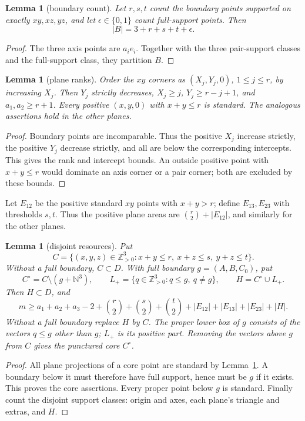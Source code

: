 \documentclass[11pt]{article}
\newtheorem{lemma}[theorem]{Lemma}
\theoremstyle{definition}
\theoremstyle{remark}
\theoremstyle{plain}
\begin{document}
\begin{lemma}[boundary count]\label{res:A.2}
Let $r,s,t$ count the boundary points supported on exactly $xy,xz,yz$,
and let $\epsilon\in\{0,1\}$ count full-support points. Then
\[
 |B|=3+r+s+t+\epsilon.
\]
\end{lemma}
\begin{proof}
The three axis points are $a_ie_i$. Together with the three pair-support
classes and the full-support class, they partition $B$. \end{proof}

\begin{lemma}[plane ranks]\label{res:A.3}
Order the $xy$ corners as $(X_j,Y_j,0)$, $1\le j\le r$, by increasing
$X_j$. Then $Y_j$ strictly decreases,
$X_j\ge j$, $Y_j\ge r-j+1$, and $a_1,a_2\ge r+1$.
Every positive $(x,y,0)$ with $x+y\le r$ is standard.
The analogous assertions hold in the other planes.
\end{lemma}
\begin{proof}
Boundary points are incomparable. Thus the positive $X_j$ increase
strictly, the positive $Y_j$ decrease strictly, and all are below the
corresponding intercepts. This gives the rank and intercept bounds.
An outside positive point with $x+y\le r$ would dominate an axis corner
or a pair corner; both are excluded by these bounds. \end{proof}

Let $E_{12}$ be the positive standard $xy$ points with $x+y>r$;
define $E_{13},E_{23}$ with thresholds $s,t$. Thus the positive plane
areas are $\binom r2+|E_{12}|$, and similarly for the other planes.

\begin{lemma}[disjoint resources]\label{res:A.4}
Put
\[
 C=\{(x,y,z)\in\mathbb Z_{>0}^3:x+y\le r,\ x+z\le s,\ y+z\le t\}.
\]
Without a full boundary, $C\subset D$. With full boundary
$g=(A,B,C_0)$, put
\[
 C^\circ=C\setminus(g+\mathbb N^3),\qquad
 L_+=\{q\in\mathbb Z_{>0}^3:q\le g,\ q\ne g\},\qquad H=C^\circ\cup L_+.
\]
Then $H\subset D$, and
\[
 m\ge a_1+a_2+a_3-2+
 \binom r2+\binom s2+\binom t2+
 |E_{12}|+|E_{13}|+|E_{23}|+|H|.\tag{3.1}\label{eq:capacity-1}
\]
Without a full boundary replace $H$ by $C$.
The proper lower box of $g$ consists of the vectors $q\le g$ other than
$g$; $L_+$ is its positive part. Removing the vectors above $g$ from $C$
gives the punctured core $C^\circ$.
\end{lemma}
\begin{proof}
All plane projections of a core point are standard by Lemma~\ref{res:A.3}. A boundary
below it must therefore have full support, hence must be $g$ if it
exists. This proves the core assertions. Every proper point below $g$
is standard. Finally count the disjoint support classes: origin and
axes, each plane's triangle and extras, and $H$. \end{proof}
\end{document}
